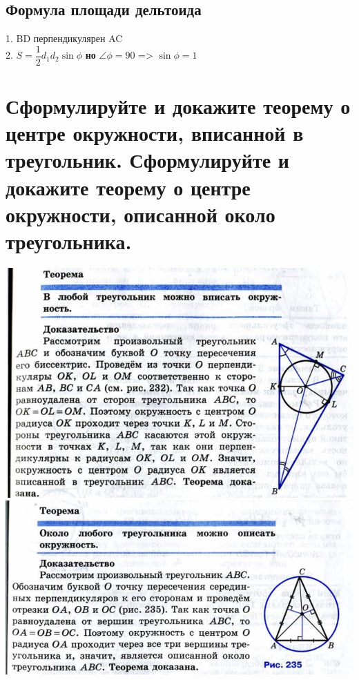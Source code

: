 \documentclass[12pt, letterpaper]{article}
\begin{document}
\subsection{Формула площади дельтоида}
1. BD перпендикулярен AC \\
2. $ S=\dfrac{1}{2} d_1 d_2 \sin{\phi} $ \textbf{но} $\angle \phi = 90$ => $\sin{\phi}=1$ \\


\section {Сформулируйте и докажите теорему о центре окружности, вписанной в треугольник. Сформулируйте и докажите теорему о центре окружности, описанной около треугольника.}
\includegraphics[scale=0.3]{legal-1.jpg} \\
\includegraphics[scale=0.3]{legal-2.jpg} \\
\end{document}
